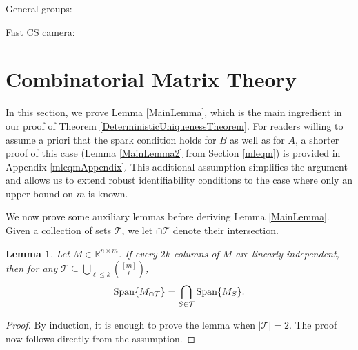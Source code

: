 \documentclass[journal, onecolumn]{IEEEtran}
\newtheorem{lemma}{Lemma}
\begin{document}
General groups: \cite{kakarala2012bispectrum}

Fast CS camera: \cite{smart2015ultrafast}




\appendices
\section{Combinatorial Matrix Theory}\label{appendixA}

In this section, we prove Lemma \ref{MainLemma}, which is the main ingredient in our proof of Theorem \ref{DeterministicUniquenessTheorem}. For readers willing to assume a priori that the spark condition holds for $B$ as well as for $A$, a shorter proof of this case (Lemma \ref{MainLemma2} from Section \ref{mleqm}) is provided in Appendix \ref{mleqmAppendix}. This additional assumption simplifies the argument and allows us to extend robust identifiability conditions to the case where only an upper bound on $m$ is known. 

We now prove some auxiliary lemmas before deriving Lemma \ref{MainLemma}.  Given a collection of sets $\mathcal{T}$, we let $\cap \mathcal{T}$ denote their intersection.


\begin{lemma}\label{SpanIntersectionLemma}
Let $M \in \mathbb{R}^{n \times m}$. If every $2k$ columns of $M$ are linearly independent, then for any $\mathcal{T} \subseteq \bigcup_{\ell \leq k} {[m] \choose \ell}$,
\begin{align}
\text{\rm Span}\{M_{\cap \mathcal{T}}\}  = \bigcap_{S \in \mathcal{T}} \text{\rm Span}\{M_S\}.
\end{align}
\end{lemma}

\begin{proof}By induction, it is enough to prove the lemma when $|\mathcal{T}| = 2$. The proof now follows directly from the assumption.
\end{proof}
\end{document}
